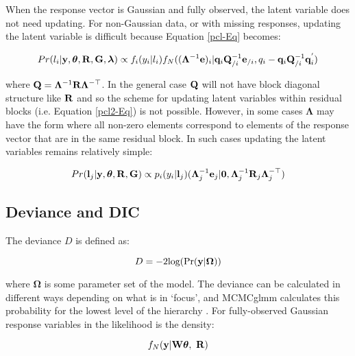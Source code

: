 \documentclass{article}
\begin{document}
When the response vector is Gaussian and fully observed, the latent variable does not need updating. For non-Gaussian data, or with missing responses, updating the latent variable is difficult because Equation \ref{pcl-Eq} becomes:

\begin{equation}
Pr(l_{i}| {\bf y}, {\bm \theta}, {\bf R}, {\bf G}, {\bm \lambda}) \propto  f_{i}(y_{i} | l_{i})f_{N}(({\bm \Lambda}^{-1}{\bf e})_{i}|{\bf q}_{i}{\bf Q}_{/i}^{-1}{\bf e}_{/i}, q_{i}-{\bf q}_{i}{\bf Q}_{/i}^{-1}{\bf q}^{'}_{i})
\end{equation}

where ${\bf Q} = {\bm \Lambda}^{-1}{\bf R}{\bm \Lambda}^{-\top}$. In the general case ${\bf Q}$ will not have block diagonal structure like ${\bf R}$ and so the scheme for updating latent variables within residual blocks (i.e. Equation \ref{pcl2-Eq}) is not possible. However, in some cases ${\bm \Lambda}$ may have the form where all non-zero elements correspond to elements of the response vector that are in the same residual block. In such cases updating the latent variables remains relatively simple:

\begin{equation}
Pr({\bf l}_{j}|{\bf y}, {\bm \theta}, {\bf R}, {\bf G}) \propto    {p}_{i}({y}_{i} | {\bf l}_{j})({\bm \Lambda}^{-1}_{j}{\bf e}_{j}|{\bf 0}, {\bm \Lambda}^{-1}_{j}{\bf R}_{j}{\bm \Lambda}^{-\top}_{j})
\end{equation}




\subsection{Deviance and DIC}

The deviance $D$ is defined as:

\begin{equation}
D = -2\textrm{log}(\Pr({\bf y} | {\bm \Omega}))
\end{equation}

where ${\bm \Omega}$ is some parameter set of the model.  The deviance can be calculated in different ways depending on what is in `focus', and MCMCglmm calculates this probability for the lowest level of the hierarchy \citep{Spiegelhalter.2002}. For fully-observed Gaussian response variables in the likelihood is the density:

\begin{equation}
f_{N}({\bf y} | {\bf W}{\bm \theta},\ {\bf R}) 
\end{equation}
\end{document}
